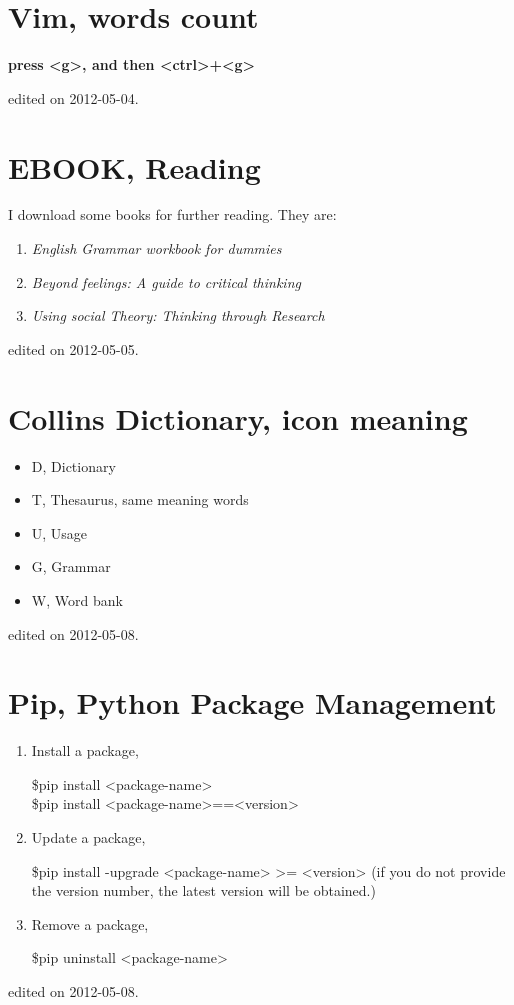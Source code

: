 \section{Vim, words count}
\begin{center}
\bf press <g>, and then <ctrl>+<g>
\end{center}
\hfill {\tiny  edited on 2012-05-04.}
\section{EBOOK, Reading}
I download some books for further reading. They are:
\begin{enumerate}
\item \emph{English Grammar workbook for dummies}
\item \emph{Beyond feelings: A guide to critical thinking}
\item \emph{Using social Theory: Thinking through Research}
\end{enumerate}
\hfill {\tiny  edited on 2012-05-05.}
%
\section{Collins Dictionary, icon meaning}
\begin{itemize}
\item D, Dictionary
\item T, Thesaurus, same meaning words
\item U, Usage
\item G, Grammar
\item W, Word bank
\end{itemize}
\hfill {\tiny  edited on 2012-05-08.}
%
\section{Pip, Python Package Management}
\begin{enumerate}
\item Install a package, \begin{center} \$pip install <package-name> \\\$pip install <package-name>==<version>\end{center}
\item Update a package, \begin{center} \$pip install -upgrade <package-name> >= <version> (if you do not provide the version number, the latest version will be obtained.)\end{center}
\item Remove a package, \begin{center} \$pip uninstall <package-name> \end{center}
\end{enumerate}
\hfill {\tiny  edited on 2012-05-08.}
%
